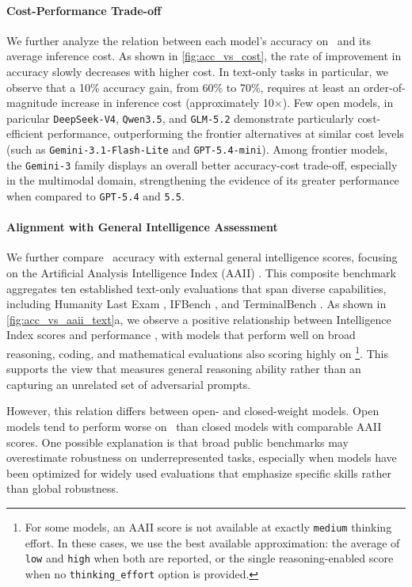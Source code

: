 \paragraph{Cost-Performance Trade-off}
We further analyze the relation between each model's accuracy on \bench\ and its average inference cost. As shown in \autoref{fig:acc_vs_cost}, the rate of improvement in accuracy slowly decreases with higher cost. In text-only tasks in particular, we observe that a 10\% accuracy gain, from 60\% to 70\%, requires at least an order-of-magnitude increase in inference cost (approximately 10$\times$).
Few open models, in paricular \texttt{DeepSeek-V4}, \texttt{Qwen3.5}, and \texttt{GLM-5.2} demonstrate particularly cost-efficient performance, outperforming the frontier alternatives at similar cost levels (such as \texttt{Gemini-3.1-Flash-Lite} and \texttt{GPT-5.4-mini}).
Among frontier models, the \texttt{Gemini-3} family displays an overall better accuracy-cost trade-off, especially in the multimodal domain, strengthening the evidence of its greater performance when compared to \texttt{GPT-5.4} and \texttt{5.5}. 

\paragraph{Alignment with General Intelligence Assessment}
We further compare \bench\ accuracy with external general intelligence scores, focusing on the Artificial Analysis Intelligence Index (AAII) \citep{artificialanalysis_methodology_2026}. This composite benchmark aggregates ten established text-only evaluations that span diverse capabilities, including Humanity Last Exam \citep{phan2025humanitys_last_exam}, IFBench \citep{pyatkin2025ifbench}, and TerminalBench \citep{merrill2026terminal_bench}. As shown in \autoref{fig:acc_vs_aaii_text}a, we observe a positive relationship between Intelligence Index scores and performance \bench, with models that perform well on broad reasoning, coding, and mathematical evaluations also scoring highly on \bench\footnote{For some models, an AAII score is not available at exactly \texttt{medium} thinking effort. In these cases, we use the best available approximation: the average of \texttt{low} and \texttt{high} when both are reported, or the single reasoning-enabled score when no \texttt{thinking\_effort} option is provided.}. This supports the view that \bench measures general reasoning ability rather than an capturing an unrelated set of adversarial prompts.

However, this relation differs between open- and closed-weight models. Open models tend to perform worse on \bench\ than closed models with comparable AAII scores. One possible explanation is that broad public benchmarks may overestimate robustness on underrepresented tasks, especially when models have been optimized for widely used evaluations that emphasize specific skills rather than global robustness.


